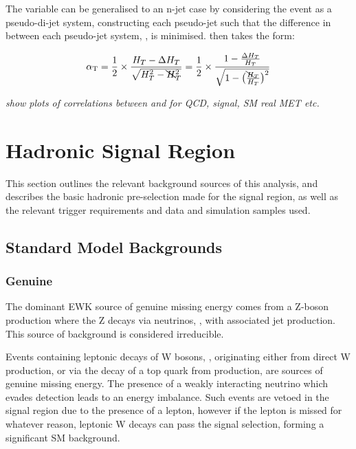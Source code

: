 The \alphat variable can be generalised to an n-jet case by considering the event as a 
pseudo-di-jet system, constructing each pseudo-jet such that the difference in \HT
between each pseudo-jet system, \deltaHT, is minimised. \alphat then takes the 
form:

\begin{equation}
\alpha_{\text{T}} = \frac{1}{2} \times \frac{H_T-\Delta H_T}{\sqrt{H_T^2 - \bcancel{H}_T^2}} = 
\frac{1}{2} \times \frac{1-\frac{\Delta H_T}{H_T}}{\sqrt{1 - \big(\frac{\bcancel{H}_T}{H_T}\big)^2}}
\label{eq:alphat_njet}
\end{equation}

\emph{show plots of correlations between \mht and \deltaHT for QCD, 
signal, SM real MET etc.}


\section{Hadronic Signal Region}
\label{sec:selection_hadronic}

This section outlines the relevant background sources of this analysis, and
describes the basic hadronic pre-selection made for the signal 
region, as well as the relevant trigger requirements and data and 
simulation samples used.

\subsection{Standard Model Backgrounds}

\subsubsection{Genuine \met}
The dominant EWK source of genuine missing energy comes from a Z-boson 
production where the Z decays
via neutrinos, \zinv, with associated jet production. This source of background
is considered irreducible.

Events containing leptonic decays of W bosons, \wlnu, originating either
from direct W production, or via the decay of a top quark from \ttbar 
production, are sources of genuine 
missing energy. The presence of a weakly interacting neutrino which evades
detection leads to an energy imbalance. Such events are vetoed in the signal
region due to the presence of a 
lepton, however if the lepton is missed for whatever reason, leptonic W decays 
can pass the signal selection, forming a significant SM background.

